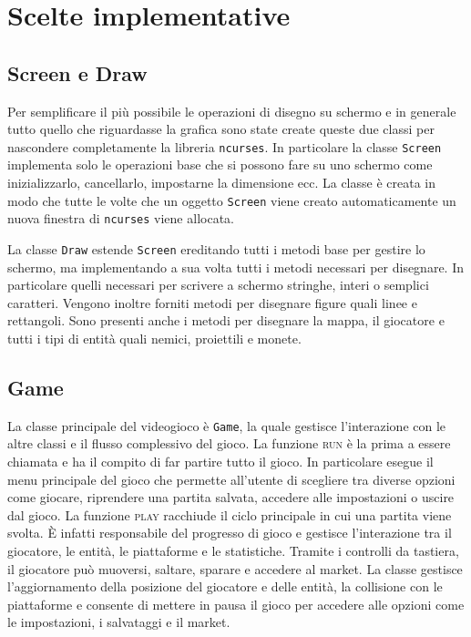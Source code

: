 \documentclass[a4paper]{article}
\begin{document}
\section{Scelte implementative}
\subsection{Screen e Draw}
Per semplificare il più possibile le operazioni di disegno su schermo e in 
generale tutto quello che riguardasse la grafica sono state create queste due
classi per nascondere completamente la libreria \texttt{ncurses}. In particolare
la classe \texttt{Screen} implementa solo le operazioni base che si possono fare
su uno schermo come inizializzarlo, cancellarlo, impostarne la dimensione ecc.
La classe è creata in modo che tutte le volte che un oggetto \texttt{Screen} 
viene creato automaticamente un nuova finestra di \texttt{ncurses} viene 
allocata.

La classe \texttt{Draw} estende \texttt{Screen} ereditando tutti i metodi base
per gestire lo schermo, ma implementando a sua volta tutti i metodi necessari 
per disegnare. In particolare quelli necessari per scrivere a schermo stringhe, 
interi o semplici caratteri. Vengono inoltre forniti metodi per disegnare figure 
quali linee e rettangoli. Sono presenti anche i metodi per disegnare la mappa, 
il giocatore e tutti i tipi di entità quali nemici, proiettili e monete.

\subsection{Game}
La classe principale del videogioco è \texttt{Game}, la quale gestisce 
l’interazione con le altre classi e il flusso complessivo del gioco. La funzione 
\textsc{run} è la prima a essere chiamata e ha il compito di far partire tutto
il gioco. In particolare esegue il menu principale del gioco che permette 
all’utente di scegliere tra diverse opzioni come giocare, riprendere una partita 
salvata, accedere alle impostazioni o uscire dal gioco. La funzione 
\textsc{play} racchiude il ciclo principale in cui una partita viene svolta. È
infatti responsabile del progresso di gioco e gestisce l’interazione tra il 
giocatore, le entità, le piattaforme e le statistiche. Tramite i controlli da 
tastiera, il giocatore può muoversi, saltare, sparare e accedere al market. 
La classe gestisce l’aggiornamento della posizione del giocatore e delle entità, 
la collisione con le piattaforme e consente di mettere in pausa il gioco per 
accedere alle opzioni come le impostazioni, i salvataggi e il market.
\end{document}
